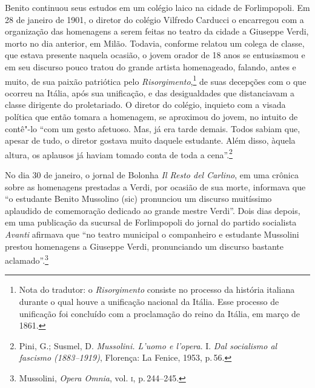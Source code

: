 Benito continuou seus estudos em um colégio laico na cidade de
Forlimpopoli. Em 28 de janeiro de 1901, o diretor do colégio Vilfredo
Carducci o encarregou com a organização das homenagens a serem feitas no
teatro da cidade a Giuseppe Verdi, morto no dia anterior, em Milão.
Todavia, conforme relatou um colega de classe, que estava presente
naquela ocasião, o jovem orador de 18 anos se entusiasmou e em seu
discurso pouco tratou do grande artista homenageado, falando, antes e
muito, de sua paixão patriótica pelo \emph{Risorgimento},\footnote{Nota
  do tradutor: o \emph{Risorgimento} consiste no processo da história
  italiana durante o qual houve a unificação nacional da Itália. Esse
  processo de unificação foi concluído com a proclamação do reino da
  Itália, em março de 1861.} de suas decepções com o que ocorreu na
Itália, após sua unificação, e das desigualdades que distanciavam a
classe dirigente do proletariado. O diretor do colégio, inquieto com a
visada política que então tomara a homenagem, se aproximou do jovem, no
intuito de contê"-lo ``com um gesto afetuoso. Mas, já era tarde demais.
Todos sabiam que, apesar de tudo, o diretor gostava muito daquele
estudante. Além disso, àquela altura, os aplausos já haviam tomado conta
de toda a cena''.\footnote{Pini, G.; Susmel, D. \emph{Mussolini. L'uomo e
  l'opera}. I. \emph{Dal socialismo al fascismo (1883--1919)}, Florença:
  La Fenice, 1953, p.\,56.}

No dia 30 de janeiro, o jornal de Bolonha \emph{Il Resto del Carlino},
em uma crônica sobre as homenagens prestadas a Verdi, por ocasião de sua
morte, informava que ``o estudante Benito Mussolino (sic) pronunciou um
discurso muitíssimo aplaudido de comemoração dedicado ao grande mestre
Verdi''. Dois dias depois, em uma publicação da sucursal de Forlimpopoli
do jornal do partido socialista \emph{Avanti} afirmava que ``no teatro
municipal o companheiro e estudante Mussolini prestou homenagens a
Giuseppe Verdi, pronunciando um discurso bastante aclamado''.\footnote{Mussolini,
  \emph{Opera Omnia}, vol. \textsc{i}, p.\,244--245.}

